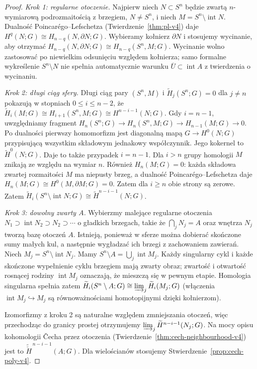 \begin{proof}
\emph{Krok 1: regularne otoczenie.}
Najpierw niech $N\subset S^n$ będzie zwartą
$n$-wymiarową podrozmaitością z brzegiem,
$N\ne S^n$, i niech $M=S^n\setminus\operatorname{int}N$.
Dualność Poincarégo--Lefschetza
(Twierdzenie~\ref{thm:pl-v4}) daje
$H^q(N;G)\cong H_{n-q}(N,\partial N;G)$.
Wybieramy kołnierz $\partial N$ i stosujemy wycinanie,
aby otrzymać
$H_{n-q}(N,\partial N;G)\cong H_{n-q}(S^n,M;G)$.
Wycinanie wolno zastosować po niewielkim odsunięciu
względem kołnierza; samo formalne wykreślenie
$S^n\setminus N$ nie spełnia automatycznie warunku
$\overline U\subset\operatorname{int}A$ z twierdzenia o wycinaniu.

\emph{Krok 2: długi ciąg sfery.}
Długi ciąg pary $(S^n,M)$ i
$\widetilde H_j(S^n;G)=0$ dla $j\ne n$
pokazują w stopniach $0\le i\le n-2$, że
$\widetilde H_i(M;G)\cong H_{i+1}(S^n,M;G)
\cong H^{n-i-1}(N;G)$.
Gdy $i=n-1$, uwzględniamy fragment
$H_n(S^n;G)\to H_n(S^n,M;G)\to H_{n-1}(M;G)\to0$.
Po dualności pierwszy homomorfizm jest diagonalną mapą
$G\to H^0(N;G)$ przypisującą wszystkim składowym
jednakowy współczynnik. Jego kokernel to
$\widetilde H^0(N;G)$.
Daje to także przypadek $i=n-1$.
Dla $i>n$ grupy homologii $M$ znikają ze względu na
wymiar $n$. Również $H_n(M;G)=0$: każda składowa zwartej
rozmaitości $M$ ma niepusty brzeg, a dualność
Poincarégo--Lefschetza daje
$H_n(M;G)\cong H^0(M,\partial M;G)=0$.
Zatem dla $i\ge n$ obie strony są zerowe.
Zatem
$\widetilde H_i(S^n\setminus\operatorname{int}N;G)
\cong\widetilde H^{n-i-1}(N;G)$.

\emph{Krok 3: dowolny zwarty $A$.}
Wybierzmy malejące regularne otoczenia
$N_1\supset\operatorname{int}N_2\supset N_2\supset\cdots$
o gładkich brzegach, takie że
$\bigcap_jN_j=A$ oraz wnętrza $N_j$ tworzą bazę
otoczeń $A$. Istnieją, ponieważ w sferze można dobierać
skończone sumy małych kul, a następnie wygładzać ich
brzegi z zachowaniem zawierań. Niech
$M_j=S^n\setminus\operatorname{int}N_j$.
Mamy $S^n\setminus A=\bigcup_j\operatorname{int}M_j$.
Każdy singularny cykl i każde skończone wypełnienie
cyklu brzegiem mają zwarty obraz; zwartość i otwartość
rosnącej rodziny $\operatorname{int}M_j$ oznaczają, że
mieszczą się w pewnym etapie. Homologia singularna
spełnia zatem
$\widetilde H_i(S^n\setminus A;G)
\cong\varinjlim_j\widetilde H_i(M_j;G)$
(włączenia $\operatorname{int}M_j\hookrightarrow M_j$
są równoważnościami homotopijnymi dzięki kołnierzom).

Izomorfizmy z kroku 2 są naturalne względem zmniejszania
otoczeń, więc przechodząc do granicy prostej otrzymujemy
$\varinjlim_j\widetilde H^{n-i-1}(N_j;G)$.
Na mocy opisu kohomologii \v{C}echa przez otoczenia
(Twierdzenie~\ref{thm:cech-neighbourhood-v4}) jest to
$\widetilde{\check H}^{\,n-i-1}(A;G)$.
Dla wielościanów stosujemy
Stwierdzenie~\ref{prop:cech-poly-v4}.
\end{proof}

